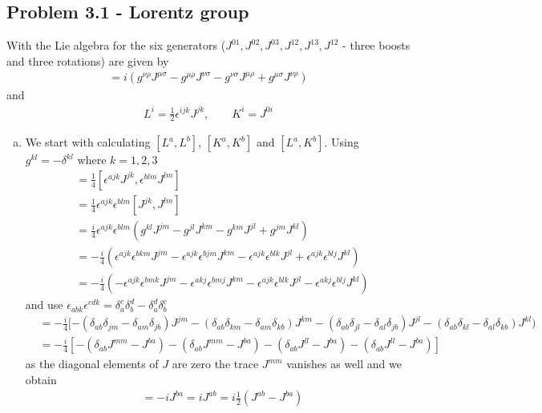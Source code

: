 \documentclass[10pt,a4paper]{book}
\theoremstyle{definition}
\begin{document}
\subsection{Problem 3.1 - Lorentz group}
With the Lie algebra for the six generators ($J^{01}, J^{02}, J^{03}, J^{12}, J^{13}, J^{12}$ - three boosts and three rotations) are  given by
\begin{align}
[J^{\mu\nu},J^{\rho\sigma}]=i(g^{\nu\rho}J^{\mu\sigma}-g^{\mu\rho}J^{\nu\sigma}-g^{\nu\sigma}J^{\mu\rho}+g^{\mu\sigma}J^{\nu\rho})
\end{align}
and
\begin{align}
L^i=\frac{1}{2}\epsilon^{ijk}J^{jk},\qquad K^i=J^{0i}
\end{align}
\begin{enumerate}[(a)]
\item We start with calculating $[L^a,L^b]$, $[K^a,K^b]$ and $[L^a,K^b]$.
Using $g^{kl}=-\delta^{kl}$ where $k=1,2,3$
\begin{align}
[L^a,L^b]&=\frac{1}{4}[\epsilon^{ajk}J^{jk},\epsilon^{blm}J^{lm}]\\
&=\frac{1}{4}\epsilon^{ajk}\epsilon^{blm}[J^{jk},J^{lm}]\\
&=\frac{i}{4}\epsilon^{ajk}\epsilon^{blm}(g^{kl}J^{jm}-g^{jl}J^{km}-g^{km}J^{jl}+g^{jm}J^{kl})\\
&=-\frac{i}{4}(\epsilon^{ajk}\epsilon^{bkm}J^{jm}-\epsilon^{ajk}\epsilon^{bjm}J^{km}-\epsilon^{ajk}\epsilon^{blk}J^{jl}+\epsilon^{ajk}\epsilon^{blj}J^{kl})\\
&=-\frac{i}{4}(-\epsilon^{ajk}\epsilon^{bmk}J^{jm}-\epsilon^{akj}\epsilon^{bmj}J^{km}-\epsilon^{ajk}\epsilon^{blk}J^{jl}-\epsilon^{akj}\epsilon^{blj}J^{kl})
\end{align}
and use $\epsilon_{abk}\epsilon^{cdk}=\delta^c_a\delta^d_b-\delta^d_a\delta^c_b$
\begin{align}
[L^a,L^b]
&=-\frac{i}{4}[
-(\delta_{ab}\delta_{jm}-\delta_{am}\delta_{jb})J^{jm}
-(\delta_{ab}\delta_{km}-\delta_{am}\delta_{kb})J^{km}
-(\delta_{ab}\delta_{jl}-\delta_{al}\delta_{jb})J^{jl}
-(\delta_{ab}\delta_{kl}-\delta_{al}\delta_{kb})J^{kl})\\
&=-\frac{i}{4}\left[
-(\delta_{ab}J^{mm}-J^{ba})
-(\delta_{ab}J^{mm}-J^{ba})
-(\delta_{ab}J^{ll}-J^{ba})
-(\delta_{ab}J^{ll}-J^{ba})\right]
\end{align}
as the diagonal elements of $J$ are zero the trace $J^{mm}$ vanishes as well and we obtain
\begin{align}
[L^a,L^b]
&=-iJ^{ba}=iJ^{ab}=i\frac{1}{2}(J^{ab}-J^{ba})\\

\end{align}
\end{enumerate}
\end{document}

